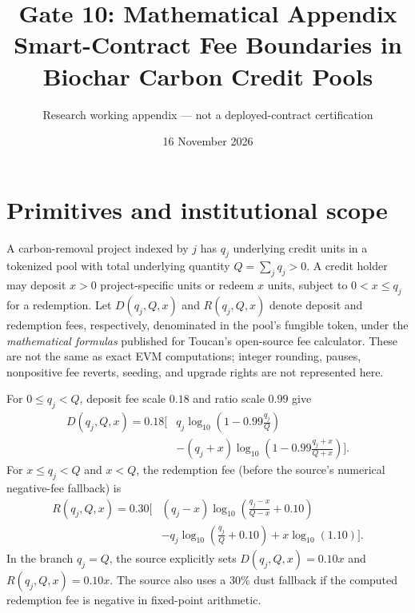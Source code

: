 \documentclass[11pt]{article}
\title{Gate 10: Mathematical Appendix\\Smart-Contract Fee Boundaries in Biochar Carbon Credit Pools}
\author{Research working appendix --- not a deployed-contract certification}
\date{16 November 2026}
\begin{document}
\maketitle
\section{Primitives and institutional scope}
A carbon-removal project indexed by $j$ has $q_j$ underlying credit units in a tokenized pool with total underlying quantity $Q=\sum_j q_j>0$. A credit holder may deposit $x>0$ project-specific units or redeem $x$ units, subject to $0<x\leq q_j$ for a redemption. Let $D(q_j,Q,x)$ and $R(q_j,Q,x)$ denote deposit and redemption fees, respectively, denominated in the pool's fungible token, under the \emph{mathematical formulas} published for Toucan's open-source fee calculator. These are not the same as exact EVM computations; integer rounding, pauses, nonpositive fee reverts, seeding, and upgrade rights are not represented here.

For $0\leq q_j<Q$, deposit fee scale $0.18$ and ratio scale $0.99$ give
\begin{align}
D(q_j,Q,x)=0.18\Bigg[&q_j\log_{10}\left(1-0.99\frac{q_j}{Q}\right)\\
&-(q_j+x)\log_{10}\left(1-0.99\frac{q_j+x}{Q+x}\right)\Bigg].\nonumber
\end{align}
For $x\leq q_j<Q$ and $x<Q$, the redemption fee (before the source's numerical negative-fee fallback) is
\begin{align}
R(q_j,Q,x)=0.30\Bigg[&(q_j-x)\log_{10}\left(\frac{q_j-x}{Q-x}+0.10\right)\\
&-q_j\log_{10}\left(\frac{q_j}{Q}+0.10\right)+x\log_{10}(1.10)\Bigg].\nonumber
\end{align}
In the branch $q_j=Q$, the source explicitly sets $D(q_j,Q,x)=0.10x$ and $R(q_j,Q,x)=0.10x$. The source also uses a $30\%$ dust fallback if the computed redemption fee is negative in fixed-point arithmetic.
\end{document}
